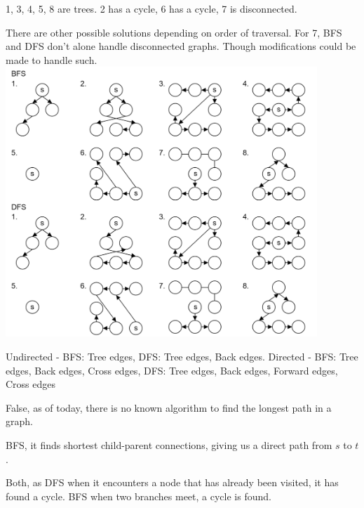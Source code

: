 \begin{Answer} 1, 3, 4, 5, 8 are trees. 2 has a cycle, 6 has a cycle, 7 is disconnected.
\end{Answer}
\begin{Answer} There are other possible solutions depending on order of traversal. For 7,
    BFS and DFS don't alone handle disconnected graphs. Though modifications could be made to handle such.
    \includegraphics[height=4in]{./Sections/graphs/dag/bfs_dfs.png}
\end{Answer}

\vspace{.5em}
\begin{Answer} Undirected - BFS: Tree edges, DFS: Tree edges, Back edges. Directed - BFS: Tree edges, Back edges, Cross edges, DFS: Tree edges, Back edges, Forward edges, Cross edges \cite{cse417dfs2021,dukegraph2017,clrs22-1}
\end{Answer}

\vspace{.5em}
\begin{Answer} False, as of today, there is no known algorithm to find the longest path in a graph.
\end{Answer}

\vspace{.5em}
\begin{Answer} BFS, it finds shortest child-parent connections, giving us a direct path from $s$ to $t$.
\end{Answer}

\vspace{.5em}
\begin{Answer} Both, as DFS when it encounters a node that has already been visited, it has found a cycle. BFS when two branches meet, a cycle is found.
\end{Answer}

